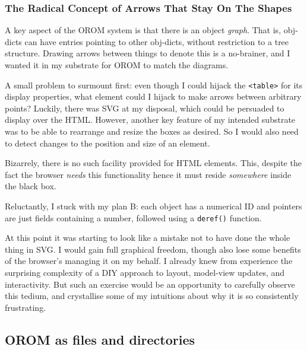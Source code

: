 \documentclass[english,submission]{programming}
\begin{document}
  \hypertarget{the-radical-concept-of-arrows-that-stay-on-the-shapes}{%
  \subsubsection{The Radical Concept of Arrows That Stay On The
  Shapes}\label{the-radical-concept-of-arrows-that-stay-on-the-shapes}}

  A key aspect of the OROM system is that there is an object \emph{graph}.
  That is, obj-dicts can have entries pointing to other obj-dicts, without
  restriction to a tree structure. Drawing arrows between things to denote
  this is a no-brainer, and I wanted it in my substrate for OROM to match
  the diagrams.

  A small problem to surmount first: even though I could hijack the
  \texttt{\textless{}table\textgreater{}} for its display properties, what
  element could I hijack to make arrows between arbitrary points? Luckily,
  there was SVG at my disposal, which could be persuaded to display over
  the HTML. However, another key feature of my intended substrate was to
  be able to rearrange and resize the boxes as desired. So I would also
  need to detect changes to the position and size of an element.

  Bizarrely, there is no such facility provided for HTML elements. This,
  despite the fact the browser \emph{needs} this functionality hence it
  must reside \emph{somewhere} inside the black box.

  Reluctantly, I stuck with my plan B: each object has a numerical ID and
  pointers are just fields containing a number, followed using a
  \texttt{deref()} function.

  At this point it was starting to look like a mistake not to have done
  the whole thing in SVG. I would gain full graphical freedom, though also
  lose some benefits of the browser's managing it on my behalf. I already
  knew from experience the surprising complexity of a DIY approach to
  layout, model-view updates, and interactivity. But such an exercise
  would be an opportunity to carefully observe this tedium, and
  crystallise some of my intuitions about why it is so consistently
  frustrating.

  \hypertarget{orom-as-files-and-directories}{%
  \subsection{OROM as files and
  directories}\label{orom-as-files-and-directories}}
\end{document}
